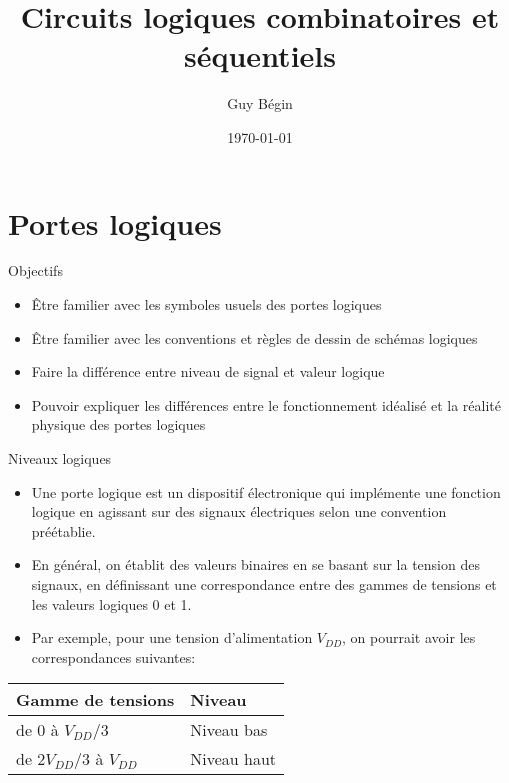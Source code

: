 \documentclass[presentation]{beamer}
\author{Guy Bégin}
\date{\today}
\title{Circuits logiques combinatoires et séquentiels}
\begin{document}
\maketitle

\section{Portes logiques}
\label{sec:orgf5f6efe}

\begin{frame}[label={sec:org5c44c79}]{Objectifs}
\begin{itemize}
\item Être familier avec les symboles usuels des portes logiques
\item Être familier avec les conventions et règles de dessin de schémas
logiques
\item Faire la différence entre niveau de signal et valeur logique
\item Pouvoir expliquer les différences entre le fonctionnement idéalisé
et la réalité physique des portes logiques
\end{itemize}
\end{frame}

\begin{frame}[label={sec:org4f2890e}]{Niveaux logiques}
\begin{itemize}
\item Une porte logique est un dispositif électronique qui implémente une fonction logique en agissant sur des signaux électriques selon une convention préétablie.

\item En général, on établit des valeurs binaires en se basant sur la tension des signaux, en définissant une correspondance entre des gammes de tensions et les valeurs logiques 0 et 1.

\item Par exemple, pour une tension d'alimentation \(V_{DD}\), on pourrait avoir les correspondances suivantes:
\end{itemize}

\begin{center}
\begin{tabular}{ll}
Gamme de tensions & Niveau\\
\hline
de 0 à  \(V_{DD}/3\) & Niveau bas\\
de \(2V_{DD}/3\) à  \(V_{DD}\) & Niveau haut\\
\end{tabular}
\end{center}
\end{frame}
\end{document}
